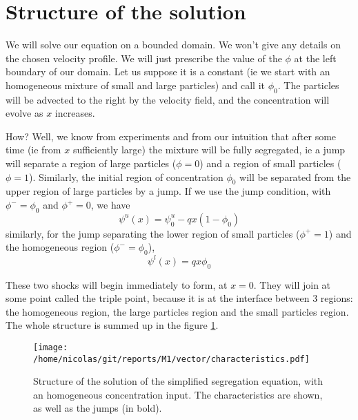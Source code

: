 \section{Structure of the solution}

We will solve our equation on a bounded domain. We won't give any details on the chosen velocity profile. We will just prescribe the value of the $\phi$ at the left boundary of our domain. Let us suppose it is a constant (ie we start with an homogeneous mixture of small and large particles) and call it $\phi_0$. The particles will be advected to the right by the velocity field, and the concentration will evolve as $x$ increases. 

How? Well, we know from experiments and from our intuition that after some time (ie from $x$ sufficiently large) the mixture will be fully segregated, ie a jump will separate a region of large particles ($\phi=0$) and a region of small particles ($\phi=1$). Similarly, the initial region of concentration $\phi_0$ will be separated from the upper region of large particles by a jump. If we use the jump condition, with $\phi^- = \phi_0$ and $\phi^+ = 0$, we have
\begin{equation}
	\psi^u(x) =  \psi^u_0 - q x (1-\phi_0)
\end{equation}
similarly, for the jump separating the lower region of small particles ($\phi^+=1$) and the homogeneous region ($\phi^- = \phi_0$),
\begin{equation}
	\psi^l(x) =q x \phi_0
\end{equation}

These two shocks will begin immediately to form, at $x=0$. They will join at some point called the triple point, because it is at the interface between 3 regions: the homogeneous region, the large particles region and the small particles region. The whole structure is summed up in the figure \ref{1}.

\begin{figure}[htp]
\centering
\texttt{[image: /home/nicolas/git/reports/M1/vector/characteristics.pdf]}
\caption{Structure of the solution of the simplified segregation equation, with an homogeneous concentration input. The characteristics are shown, as well as the jumps (in bold).}
\label{1}
\end{figure}
